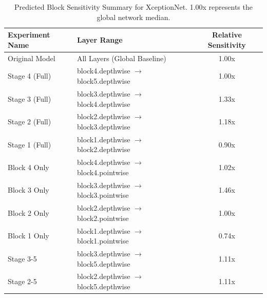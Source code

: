 \begin{table}[h]
\caption{Predicted Block Sensitivity Summary for XceptionNet. 1.00x represents the global network median.}
\label{tab:rel_sens_summary_xceptionnet}
\begin{tabular}{llc}
\toprule
Experiment Name & Layer Range & Relative Sensitivity \\
\midrule
Original Model & All Layers (Global Baseline) & 1.00x \\
Stage 4 (Full) & block4.depthwise $\to$ block5.depthwise & 1.00x \\
Stage 3 (Full) & block3.depthwise $\to$ block4.depthwise & 1.33x \\
Stage 2 (Full) & block2.depthwise $\to$ block3.depthwise & 1.18x \\
Stage 1 (Full) & block1.depthwise $\to$ block2.depthwise & 0.90x \\
Block 4 Only & block4.depthwise $\to$ block4.pointwise & 1.02x \\
Block 3 Only & block3.depthwise $\to$ block3.pointwise & 1.46x \\
Block 2 Only & block2.depthwise $\to$ block2.pointwise & 1.00x \\
Block 1 Only & block1.depthwise $\to$ block1.pointwise & 0.74x \\
Stage 3-5 & block3.depthwise $\to$ block5.depthwise & 1.11x \\
Stage 2-5 & block2.depthwise $\to$ block5.depthwise & 1.11x \\
\bottomrule
\end{tabular}
\end{table}
